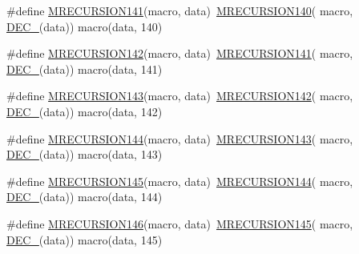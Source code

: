 \begin{DoxyCompactItemize}
\item 
\#define \mbox{\hyperlink{group__group__sam0__utils__mrecursion_ga5868ade7134f4814c3e19853c9cd518c}{M\+R\+E\+C\+U\+R\+S\+I\+O\+N141}}(macro,  data)~\mbox{\hyperlink{group__group__sam0__utils__mrecursion_gad48f900c9eaf24623bd027ea995b45ad}{M\+R\+E\+C\+U\+R\+S\+I\+O\+N140}}(  macro, \mbox{\hyperlink{group__group__sam0__utils__mrecursion_ga1d23d683797679dca8c3512a54a5dcae}{D\+E\+C\+\_\+}}(data))   macro(data, 140)
\item 
\#define \mbox{\hyperlink{group__group__sam0__utils__mrecursion_ga815d871c17da260055328809979ff474}{M\+R\+E\+C\+U\+R\+S\+I\+O\+N142}}(macro,  data)~\mbox{\hyperlink{group__group__sam0__utils__mrecursion_ga5868ade7134f4814c3e19853c9cd518c}{M\+R\+E\+C\+U\+R\+S\+I\+O\+N141}}(  macro, \mbox{\hyperlink{group__group__sam0__utils__mrecursion_ga1d23d683797679dca8c3512a54a5dcae}{D\+E\+C\+\_\+}}(data))   macro(data, 141)
\item 
\#define \mbox{\hyperlink{group__group__sam0__utils__mrecursion_ga13c48d426b2457b2bb7ded0974e15122}{M\+R\+E\+C\+U\+R\+S\+I\+O\+N143}}(macro,  data)~\mbox{\hyperlink{group__group__sam0__utils__mrecursion_ga815d871c17da260055328809979ff474}{M\+R\+E\+C\+U\+R\+S\+I\+O\+N142}}(  macro, \mbox{\hyperlink{group__group__sam0__utils__mrecursion_ga1d23d683797679dca8c3512a54a5dcae}{D\+E\+C\+\_\+}}(data))   macro(data, 142)
\item 
\#define \mbox{\hyperlink{group__group__sam0__utils__mrecursion_ga287fe5ff9404d3037343ce6cb798718d}{M\+R\+E\+C\+U\+R\+S\+I\+O\+N144}}(macro,  data)~\mbox{\hyperlink{group__group__sam0__utils__mrecursion_ga13c48d426b2457b2bb7ded0974e15122}{M\+R\+E\+C\+U\+R\+S\+I\+O\+N143}}(  macro, \mbox{\hyperlink{group__group__sam0__utils__mrecursion_ga1d23d683797679dca8c3512a54a5dcae}{D\+E\+C\+\_\+}}(data))   macro(data, 143)
\item 
\#define \mbox{\hyperlink{group__group__sam0__utils__mrecursion_ga3314ae66e82b16e923a2925e15839602}{M\+R\+E\+C\+U\+R\+S\+I\+O\+N145}}(macro,  data)~\mbox{\hyperlink{group__group__sam0__utils__mrecursion_ga287fe5ff9404d3037343ce6cb798718d}{M\+R\+E\+C\+U\+R\+S\+I\+O\+N144}}(  macro, \mbox{\hyperlink{group__group__sam0__utils__mrecursion_ga1d23d683797679dca8c3512a54a5dcae}{D\+E\+C\+\_\+}}(data))   macro(data, 144)
\item 
\#define \mbox{\hyperlink{group__group__sam0__utils__mrecursion_ga266f741d92739be1a64e16447fe11eca}{M\+R\+E\+C\+U\+R\+S\+I\+O\+N146}}(macro,  data)~\mbox{\hyperlink{group__group__sam0__utils__mrecursion_ga3314ae66e82b16e923a2925e15839602}{M\+R\+E\+C\+U\+R\+S\+I\+O\+N145}}(  macro, \mbox{\hyperlink{group__group__sam0__utils__mrecursion_ga1d23d683797679dca8c3512a54a5dcae}{D\+E\+C\+\_\+}}(data))   macro(data, 145)

\end{DoxyCompactItemize}
